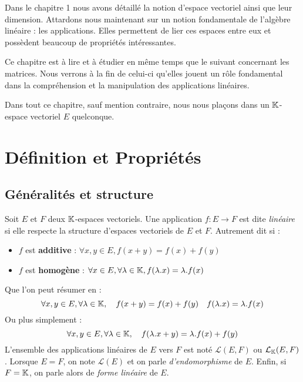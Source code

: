 
\minitoc  %

Dans le chapitre 1 nous avons détaillé la notion d'espace vectoriel ainsi que leur dimension. 
Attardons nous maintenant sur un notion fondamentale de l'algèbre linéaire : les applications. 
Elles permettent de lier ces espaces entre eux et possèdent beaucoup de propriétés intéressantes. 

Ce chapitre est à lire et à étudier en même temps que le suivant concernant les matrices. Nous verrons à la fin de celui-ci 
qu'elles jouent un rôle fondamental dans la compréhension et la manipulation des applications linéaires. 

\vspace{0.3cm}

Dans tout ce chapitre, sauf mention contraire, nous nous plaçons dans un $\mathbb{K}$-espace vectoriel $E$ quelconque. 


\section{Définition et Propriétés}

\subsection{Généralités et structure}

\begin{definition}
    Soit $E$ et $F$ deux $\mathbb{K}$-espaces vectoriels. Une {application} $f : E \longrightarrow F$ est dite 
    \emph{linéaire} si elle respecte la structure d'espaces vectoriels de $E$ et $F$. 
    Autrement dit si :  
    \begin{itemize}
        \item $f$ est \textbf{additive} : $ \forall x,y \in E, f(x+y) = f(x) + f(y) $ 
        \item $f$ est \textbf{homogène} : $ \forall x \in E, \forall \lambda \in \mathbb{K}, f(\lambda.x) = \lambda . f(x) $ 
    \end{itemize}
    Que l'on peut résumer en : 
        \[ \forall x,y \in E, \forall \lambda \in \mathbb{K}, \quad f(x+y) = f(x) + f(y) \quad f(\lambda.x) = \lambda . f(x) \] 
    Ou plus simplement : 
        \[ \forall x,y \in E, \forall \lambda \in \mathbb{K}, \quad f(\lambda. x+y) = \lambda. f(x) + f(y) \] 
    L'ensemble des applications linéaires de $E$ vers $F$ est noté $ \mathcal{L}(E,F)$ ou $ \mathcal{L}_{\mathbb{K}}(E,F)$. 
    Lorsque $E = F$, on note $ \mathcal{L}(E)$ et on parle \emph{d'endomorphisme} de $E$. 
    Enfin, si $F = \mathbb{K}$, on parle alors de \emph{forme linéaire} de $E$. 
\end{definition}

